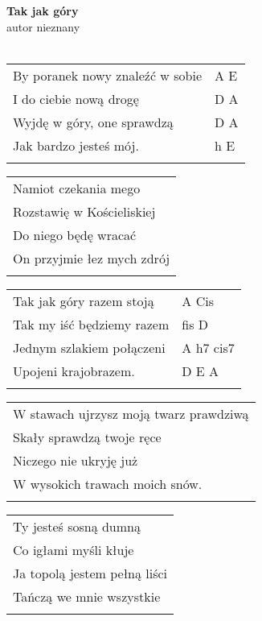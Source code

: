 \documentclass[a5paper]{article}
\begin{document}


\noindent
\fontsize{12pt}{15pt}\selectfont
\textbf{Tak jak góry} \\
\fontsize{8pt}{10pt}\selectfont
autor nieznany \\ \\
\fontsize{10pt}{12pt}\selectfont
{}
\begin{tabular}{@{}p{6.50cm}p{3cm}@{}}
\noindent
By poranek nowy znaleźć w sobie & A E \\
I do ciebie nową drogę & D A \\
Wyjdę w góry, one sprawdzą & D A \\
Jak bardzo jesteś mój. & h E \\ \\
\end{tabular}

\noindent
\begin{tabular}{@{}p{6.50cm}@{}}
Namiot czekania mego \\
Rozstawię w Kościeliskiej \\
Do niego będę wracać \\
On przyjmie łez mych zdrój \\ \\
\end{tabular}

\noindent
\begin{tabular}{@{}p{6.50cm}p{3cm}@{}}
Tak jak góry razem stoją & A Cis \\
Tak my iść będziemy razem & fis D \\
Jednym szlakiem połączeni & A h7 cis7 \\
Upojeni krajobrazem. & D E A \\ \\
\end{tabular}

\noindent
\begin{tabular}{@{}p{6.50cm}@{}}
W stawach ujrzysz moją twarz prawdziwą \\
Skały sprawdzą twoje ręce \\
Niczego nie ukryję już \\
W wysokich trawach moich snów. \\ \\
\end{tabular}

\noindent
\begin{tabular}{@{}p{6.50cm}@{}}
Ty jesteś sosną dumną \\
Co igłami myśli kłuje \\
Ja topolą jestem pełną liści \\
Tańczą we mnie wszystkie \\ \\
\end{tabular}
\end{document}
